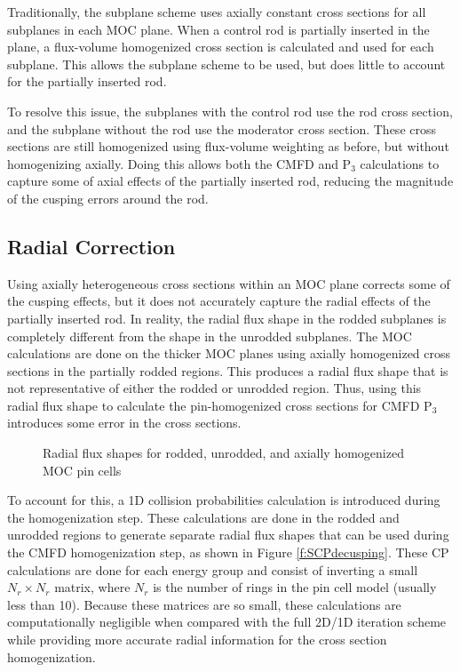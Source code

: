 Traditionally, the subplane scheme uses axially constant cross sections for all subplanes in each MOC plane.  When a control rod is partially inserted in the plane, a flux-volume homogenized cross section is calculated and used for each subplane.  This allows the subplane scheme to be used, but does little to account for the partially inserted rod.

To resolve this issue, the subplanes with the control rod use the rod cross section, and the subplane without the rod use the moderator cross section.  These cross sections are still homogenized using flux-volume weighting as before, but without homogenizing axially.  Doing this allows both the CMFD and P$_3$ calculations to capture some of axial effects of the partially inserted rod, reducing the magnitude of the cusping errors around the rod.

\subsection{Radial Correction}

Using axially heterogeneous cross sections within an MOC plane corrects some of the cusping effects, but it does not accurately capture the radial effects of the partially inserted rod.  In reality, the radial flux shape in the rodded subplanes is completely different from the shape in the unrodded subplanes.  The MOC calculations are done on the thicker MOC planes using axially homogenized cross sections in the partially rodded regions.  This produces a radial flux shape that is not representative of either the rodded or unrodded region.  Thus, using this radial flux shape to calculate the pin-homogenized cross sections for CMFD P$_3$ introduces some error in the cross sections.

\begin{figure}
    \centering
    \caption{Radial flux shapes for rodded, unrodded, and axially homogenized MOC pin cells}\label{f:radialFluxProfiles}
\end{figure}

To account for this, a 1D collision probabilities calculation is introduced during the homogenization step.  These calculations are done in the rodded and unrodded regions to generate separate radial flux shapes that can be used during the CMFD homogenization step, as shown in Figure \ref{f:SCPdecusping}.  These CP calculations are done for each energy group and consist of inverting a small $N_r \times N_r$ matrix, where $N_r$ is the number of rings in the pin cell model (usually less than 10).  Because these matrices are so small, these calculations are computationally negligible when compared with the full 2D/1D iteration scheme while providing more accurate radial information for the cross section homogenization.

